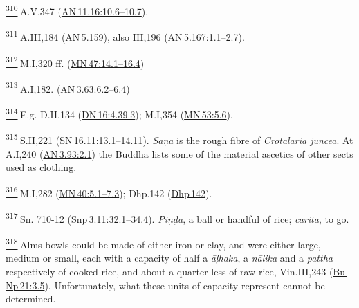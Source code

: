 \label{footprints_split_024.html_fn310}
\hyperref[footprints_split_010.htmlux5cux23fnref310]{\textsuperscript{310}} A.V,347
(\href{https://suttacentral.net/an11.16/en/sujato\#10.6}{AN\,11.16:10.6--10.7}).

\label{footprints_split_024.html_fn311}
\hyperref[footprints_split_010.htmlux5cux23fnref311]{\textsuperscript{311}} A.III,184
(\href{https://suttacentral.net/an5.159/en/sujato}{AN\,5.159}), also
III,196
(\href{https://suttacentral.net/an5.167/en/sujato\#1.1}{AN\,5.167:1.1--2.7}).

\label{footprints_split_024.html_fn312}
\hyperref[footprints_split_010.htmlux5cux23fnref312]{\textsuperscript{312}} M.I,320
ff.
(\href{https://suttacentral.net/mn47/en/sujato\#14.1}{MN\,47:14.1--16.4})

\label{footprints_split_024.html_fn313}
\hyperref[footprints_split_011.htmlux5cux23fnref313]{\textsuperscript{313}} A.I,182.
(\href{https://suttacentral.net/an3.63/en/sujato\#6.2}{AN\,3.63:6.2--6.4})

\label{footprints_split_024.html_fn314}
\hyperref[footprints_split_011.htmlux5cux23fnref314]{\textsuperscript{314}} E.g.
D.II,134
(\href{https://suttacentral.net/dn16/en/sujato\#4.39.3}{DN\,16:4.39.3});
M.I,354
(\href{https://suttacentral.net/mn53/en/sujato\#5.6}{MN\,53:5.6}).

\label{footprints_split_024.html_fn315}
\hyperref[footprints_split_011.htmlux5cux23fnref315]{\textsuperscript{315}} S.II,221
(\href{https://suttacentral.net/sn16.11/en/sujato\#13.1}{SN\,16.11:13.1--14.11}).
\emph{Sāṇa} is the rough fibre of \emph{Crotalaria juncea}. At A.I,240
(\href{https://suttacentral.net/an3.93/en/sujato\#2.1}{AN\,3.93:2.1})
the Buddha lists some of the material ascetics of other sects used as
clothing.

\label{footprints_split_024.html_fn316}
\hyperref[footprints_split_011.htmlux5cux23fnref316]{\textsuperscript{316}} M.I,282
(\href{https://suttacentral.net/mn40/en/sujato\#5.1}{MN\,40:5.1--7.3});
Dhp.142 (\href{https://suttacentral.net/dhp142/en/sujato}{Dhp\,142}).

\label{footprints_split_024.html_fn317}
\hyperref[footprints_split_011.htmlux5cux23fnref317]{\textsuperscript{317}} Sn.
710-12
(\href{https://suttacentral.net/snp3.11/en/sujato\#32.1}{Snp\,3.11:32.1--34.4}).
\emph{Piṇḍa}, a ball or handful of rice; \emph{cārita}, to go.

\label{footprints_split_024.html_fn318}
\hyperref[footprints_split_011.htmlux5cux23fnref318]{\textsuperscript{318}} Alms
bowls could be made of either iron or clay, and were either large,
medium or small, each with a capacity of half a \emph{āḷhaka}, a
\emph{nālika} and a \emph{pattha} respectively of cooked rice, and about
a quarter less of raw rice, Vin.III,243
(\href{https://suttacentral.net/pli-tv-bu-vb-np21/en/brahmali?\#3.5}{Bu\,Np\,21:3.5}).
Unfortunately, what these units of capacity represent cannot be
determined.

